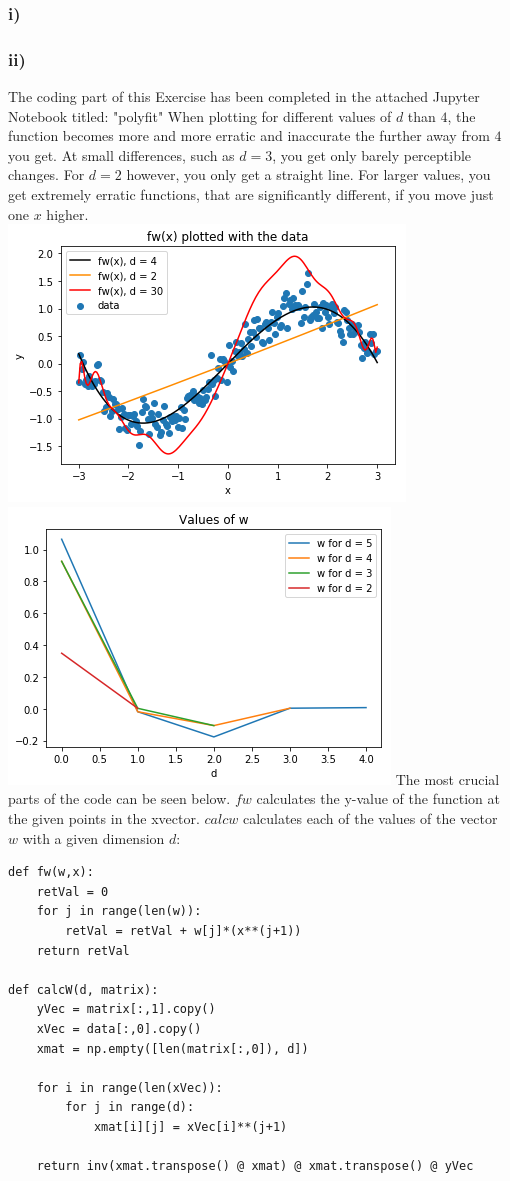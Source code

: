 \subsubsection{i)}
\subsubsection{ii)}
The coding part of this Exercise has been completed in the attached Jupyter Notebook titled: "polyfit"
When plotting for different values of $d$ than $4$, the function becomes more and more erratic and inaccurate the further away from $4$ you get. At small differences, such as $d=3$, you get only barely perceptible changes. For $d=2$ however, you only get a straight line. For larger values, you get extremely erratic functions, that are significantly different, if you move just one $x$ higher.\\
\includegraphics[width=0.5\linewidth]{fwx}
\includegraphics[width=0.5\linewidth]{calcw}
The most crucial parts of the code can be seen below. $fw$ calculates the y-value of the function at the given points in the xvector. $calcw$ calculates each of the values of the vector $w$ with a given dimension $d$:
\begin{verbatim}
def fw(w,x):
    retVal = 0
    for j in range(len(w)):
        retVal = retVal + w[j]*(x**(j+1))
    return retVal
    
def calcW(d, matrix):
    yVec = matrix[:,1].copy()
    xVec = data[:,0].copy()
    xmat = np.empty([len(matrix[:,0]), d])
    
    for i in range(len(xVec)):
        for j in range(d):
            xmat[i][j] = xVec[i]**(j+1)

    return inv(xmat.transpose() @ xmat) @ xmat.transpose() @ yVec
\end{verbatim}